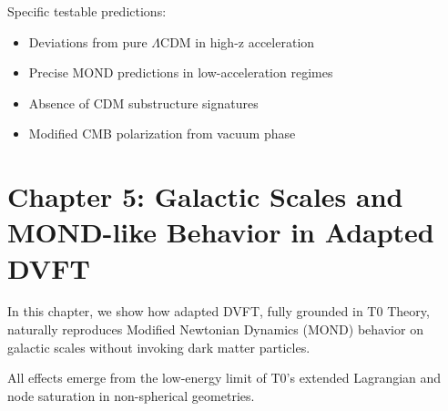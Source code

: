 	\begin{table}[htbp]
		\centering        {}
		\caption{Cosmological predictions comparison}
		\label{tab:cosmo}
	\end{table}
	
	Specific testable predictions:
	\begin{itemize}
		\item Deviations from pure $\Lambda$CDM in high-z acceleration
		\item Precise MOND predictions in low-acceleration regimes
		\item Absence of CDM substructure signatures
		\item Modified CMB polarization from vacuum phase
	\end{itemize}
	
	\section{Chapter 5: Galactic Scales and MOND-like Behavior in Adapted DVFT}
	
	In this chapter, we show how adapted DVFT, fully grounded in T0 Theory, naturally reproduces Modified Newtonian Dynamics (MOND) behavior on galactic scales without invoking dark matter particles.
	
	All effects emerge from the low-energy limit of T0's extended Lagrangian and node saturation in non-spherical geometries.
	
